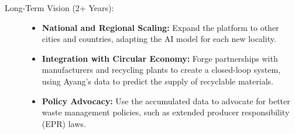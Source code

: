 {\begin{description}
    \item[Long-Term Vision (2+ Years):]

          \begin{itemize}
            \item \textbf{National and Regional Scaling:} Expand the platform to other cities and countries, adapting the AI model for each new locality.

            \item \textbf{Integration with Circular Economy:} Forge partnerships with manufacturers and recycling plants to create a closed-loop system, using Ayang's data to predict the supply of recyclable materials.

            \item \textbf{Policy Advocacy:} Use the accumulated data to advocate for better waste management policies, such as extended producer responsibility (EPR) laws.
          \end{itemize}
  \end{description}

  
}
